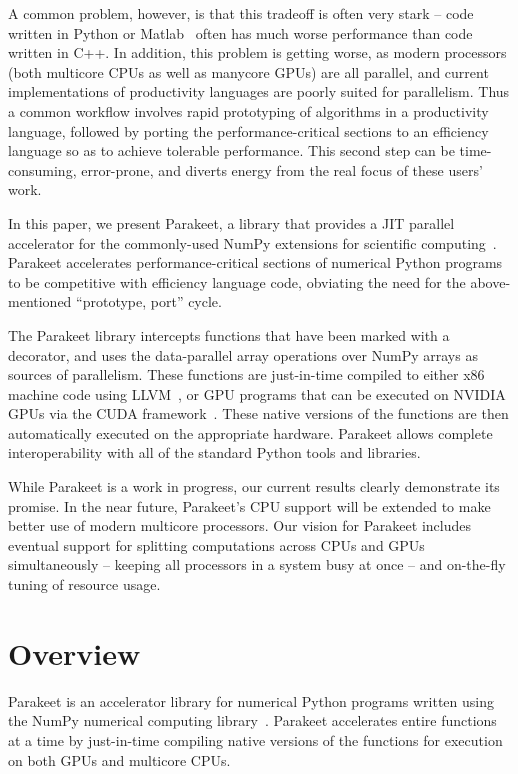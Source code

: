 \documentclass[10pt,twocolumn]{article}
\begin{document}
A common problem, however, is that this tradeoff is often very stark -- code written in Python or Matlab~\cite{Moler80} often has much worse performance than code written in C++.  In addition, this problem is getting worse, as modern processors (both multicore CPUs as well as manycore GPUs) are all parallel, and current implementations of productivity languages are poorly suited for parallelism.  Thus a common workflow involves rapid prototyping of algorithms in a productivity language, followed by porting the performance-critical sections to an efficiency language so as to achieve tolerable performance.  This second step can be time-consuming, error-prone, and diverts energy from the real focus of these users' work.

In this paper, we present Parakeet, a library that provides a JIT parallel accelerator for the commonly-used NumPy extensions for scientific computing~\cite{Oliphant07}. Parakeet accelerates performance-critical sections of numerical Python programs to be competitive with efficiency language code, obviating the need for the above-mentioned ``prototype, port'' cycle.

The Parakeet library intercepts functions that have been marked with a decorator, and uses the data-parallel array operations over NumPy arrays as sources of parallelism. These functions are just-in-time compiled to either x86 machine code using LLVM~\cite{Latt02}, or GPU programs that can be executed on NVIDIA GPUs via the CUDA framework~\cite{NvidCU}. These native versions of the functions are then automatically executed on the appropriate hardware. Parakeet allows complete interoperability with all of the standard Python tools and libraries.

While Parakeet is a work in progress, our current results clearly demonstrate its promise.  In the near future, Parakeet's CPU support will be extended to make better use of modern multicore processors.  Our vision for Parakeet includes eventual support for splitting computations across CPUs and GPUs simultaneously -- keeping all processors in a system busy at once -- and on-the-fly tuning of resource usage.

\section{Overview}
\label{overview}
Parakeet is an accelerator library for numerical Python programs written using the NumPy numerical computing library~\cite{Oliphant07}.  Parakeet accelerates entire functions at a time by just-in-time compiling native versions of the functions for execution on both GPUs and multicore CPUs.
\end{document}

